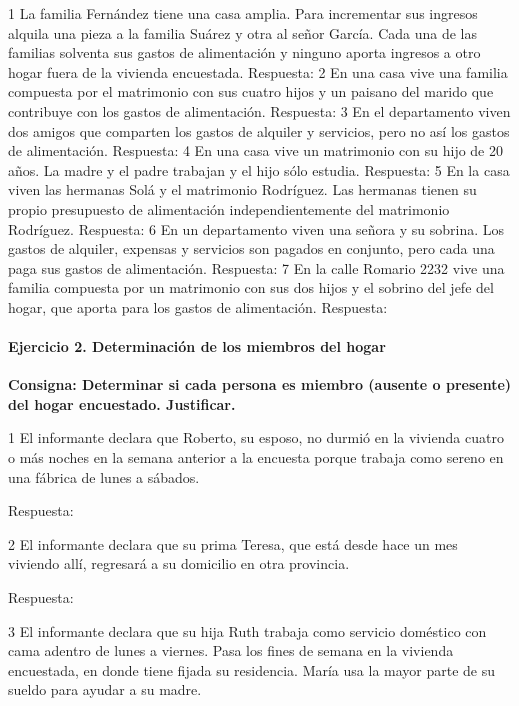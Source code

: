 \documentclass[
  openany]{book}
\begin{document}
1 La familia Fernández tiene una casa amplia. Para incrementar sus ingresos alquila una pieza a la familia Suárez y otra al señor García. Cada una de las familias solventa sus gastos de alimentación y ninguno aporta ingresos a otro hogar fuera de la vivienda encuestada. Respuesta: 2 En una casa vive una familia compuesta por el matrimonio con sus cuatro hijos y un paisano del marido que contribuye con los gastos de alimentación. Respuesta: 3 En el departamento viven dos amigos que comparten los gastos de alquiler y servicios, pero no así los gastos de alimentación. Respuesta: 4 En una casa vive un matrimonio con su hijo de 20 años. La madre y el padre trabajan y el hijo sólo estudia. Respuesta: 5 En la casa viven las hermanas Solá y el matrimonio Rodríguez. Las hermanas tienen su propio presupuesto de alimentación independientemente del matrimonio Rodríguez. Respuesta: 6 En un departamento viven una señora y su sobrina. Los gastos de alquiler, expensas y servicios son pagados en conjunto, pero cada una paga sus gastos de alimentación. Respuesta: 7 En la calle Romario 2232 vive una familia compuesta por un matrimonio con sus dos hijos y el sobrino del jefe del hogar, que aporta para los gastos de alimentación. Respuesta:

\hypertarget{ejercicio-2.-determinaciuxf3n-de-los-miembros-del-hogar}{%
\paragraph{Ejercicio 2. Determinación de los miembros del hogar}\label{ejercicio-2.-determinaciuxf3n-de-los-miembros-del-hogar}}

\textbf{Consigna: Determinar si cada persona es miembro (ausente o presente) del hogar encuestado. Justificar.}

1 El informante declara que Roberto, su esposo, no durmió en la vivienda cuatro o más noches en la semana anterior a la encuesta porque trabaja como sereno en una fábrica de lunes a sábados.

Respuesta:

2 El informante declara que su prima Teresa, que está desde hace un mes viviendo allí, regresará a su domicilio en otra provincia.

Respuesta:

3 El informante declara que su hija Ruth trabaja como servicio doméstico con cama adentro de lunes a viernes. Pasa los fines de semana en la vivienda encuestada, en donde tiene fijada su residencia. María usa la mayor parte de su sueldo para ayudar a su madre.
\end{document}
